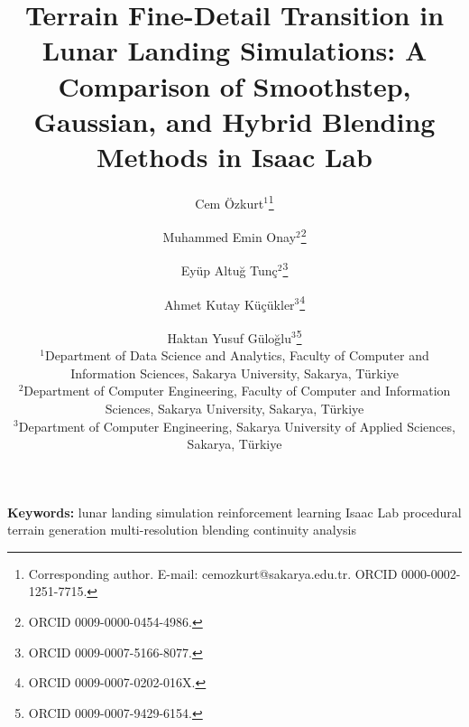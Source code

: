 \documentclass[11pt,a4paper]{article}
\title{\bfseries Terrain Fine-Detail Transition in Lunar Landing Simulations:
A Comparison of Smoothstep, Gaussian, and Hybrid Blending Methods in Isaac Lab}
\author{Cem \"Ozkurt$^{1}$\thanks{Corresponding author. E-mail: cemozkurt@sakarya.edu.tr.
ORCID 0000-0002-1251-7715.}
\and Muhammed Emin Onay$^{2}$\thanks{ORCID 0009-0000-0454-4986.}
\and Ey\"up Altu\u{g} Tun\c{c}$^{2}$\thanks{ORCID 0009-0007-5166-8077.}
\and Ahmet Kutay K\"u\c{c}\"ukler$^{3}$\thanks{ORCID 0009-0007-0202-016X.}
\and Haktan Yusuf G\"ulo\u{g}lu$^{3}$\thanks{ORCID 0009-0007-9429-6154.}\\[0.4em]
\small $^{1}$Department of Data Science and Analytics, Faculty of Computer and
Information Sciences, Sakarya University, Sakarya, T\"urkiye\\
\small $^{2}$Department of Computer Engineering, Faculty of Computer and
Information Sciences, Sakarya University, Sakarya, T\"urkiye\\
\small $^{3}$Department of Computer Engineering, Sakarya University of Applied
Sciences, Sakarya, T\"urkiye}
\date{}
\begin{document}
\maketitle

\begin{abstract}
\noindent

\end{abstract}

\noindent\textbf{Keywords:} lunar landing simulation \textbullet{}
reinforcement learning \textbullet{} Isaac Lab \textbullet{} procedural terrain
generation \textbullet{} multi-resolution blending \textbullet{} continuity
analysis

\bigskip





\end{document}
